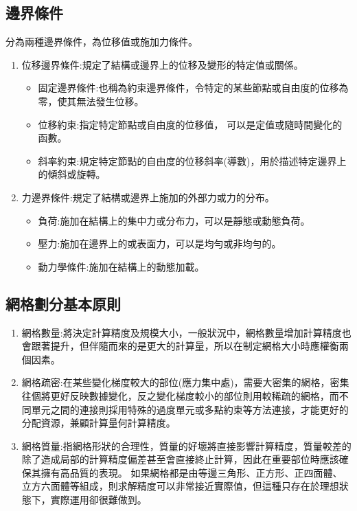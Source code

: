 \subsection{邊界條件}
分為兩種邊界條件，為位移值或施加力條件。\\

\begin{enumerate}
\item 位移邊界條件:規定了結構或邊界上的位移及變形的特定值或關係。

\begin{itemize}
\item 固定邊界條件:也稱為約束邊界條件，令特定的某些節點或自由度的位移為零，使其無法發生位移。
\item 位移約束:指定特定節點或自由度的位移值， 可以是定值或隨時間變化的函數。
\item 斜率約束:規定特定節點的自由度的位移斜率(導數)，用於描述特定邊界上的傾斜或旋轉。
\end{itemize}

\item 力邊界條件:規定了結構或邊界上施加的外部力或力的分布。

\begin{itemize}
\item 負荷:施加在結構上的集中力或分布力，可以是靜態或動態負荷。
\item 壓力:施加在邊界上的或表面力，可以是均勻或非均勻的。
\item 動力學條件:施加在結構上的動態加載。
\end{itemize}
\end{enumerate}

\subsection{網格劃分基本原則}
\begin{enumerate}
\item 網格數量:將決定計算精度及規模大小，一般狀況中，網格數量增加計算精度也會跟著提升，但伴隨而來的是更大的計算量，所以在制定網格大小時應權衡兩個因素。
\item 網格疏密:在某些變化梯度較大的部位(應力集中處)，需要大密集的網格，密集往個將更好反映數據變化，反之變化梯度較小的部位則用較稀疏的網格，而不同單元之間的連接則採用特殊的過度單元或多點約束等方法連接，才能更好的分配資源，兼顧計算量何計算精度。
\item 網格質量:指網格形狀的合理性，質量的好壞將直接影響計算精度，質量較差的除了造成局部的計算精度偏差甚至會直接終止計算，因此在重要部位時應該確保其擁有高品質的表現。
如果網格都是由等邊三角形、正方形、正四面體、立方六面體等組成，則求解精度可以非常接近實際值，但這種只存在於理想狀態下，實際運用卻很難做到。\
\end{enumerate}

